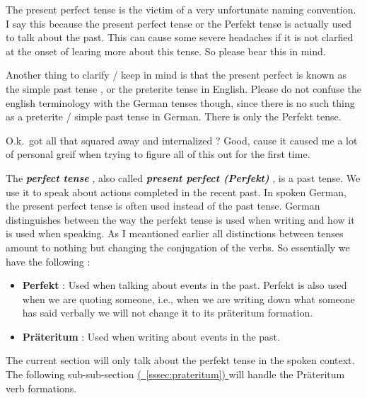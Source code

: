 \documentclass[a4paper,twocolumn,10pt]{article}
\newcommand{\newpar}
{\par \vspace{0.3cm}}
\newcommand{\refsssec}[1]
{
	\hyperref[sec:#1]
	{
		(\textsection~\ref{sssec:#1})
	}
}
\begin{document}

The present perfect tense is the victim of a very unfortunate naming convention.
I say this because the present perfect tense or the Perfekt tense is actually
used to talk about the past. This can cause some severe headaches if it is not
clarfied at the onset of learing more about this tense. So please bear this in
mind.\newpar

Another thing to clarify / keep in mind is that the present perfect is known as
the simple past tense , or the preterite tense in English.  Please do not
confuse the english terminology with the German tenses though, since there is no
such thing as a preterite / simple past tense in German. There is only the
Perfekt tense.\newpar

O.k.\ got all that squared away and internalized ? Good, cause it caused me a
lot of personal greif when trying to figure all of this out for the first
time.\newpar

The \textbf{\textit{perfect tense}} , also called \textbf{\textit{present
		perfect (Perfekt)}} , is a past tense. We use it to speak about actions
completed in the recent past. In spoken German, the present perfect tense is
often used instead of the past tense. German distinguishes between the way the
perfekt tense is used when writing and how it is used when speaking. As I
meantioned earlier all distinctions between tenses amount to nothing but
changing the conjugation of the verbs. So essentially we have the following
:\newpar


\begin{itemize}[noitemsep]

	\item \textbf{Perfekt} : Used when talking about events in the past. Perfekt is also
		used when we are quoting someone, i.e., when we are writing down what
		someone has said verbally we will not change it to its präteritum
		formation.\\

	\item \textbf{Präteritum} : Used when writing about events in the past.\\

\end{itemize}


The current section will only talk about the perfekt tense in the spoken
context. The following sub-sub-section \refsssec{prateritum} will handle the
Präteritum verb formations.\newpar
\end{document}
